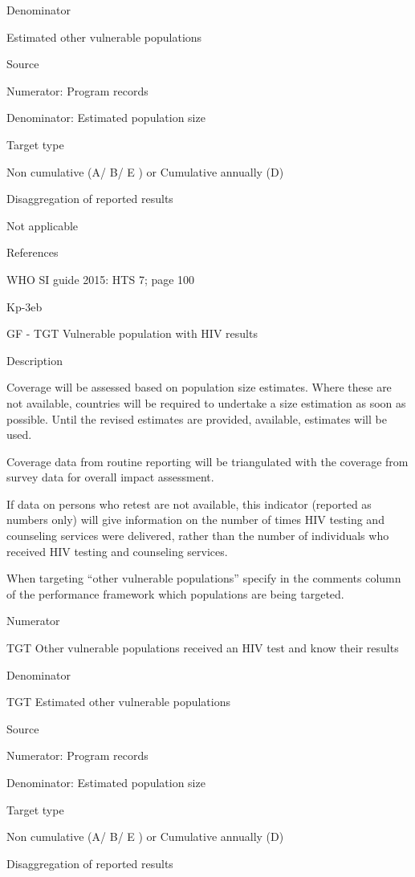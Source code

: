 \documentclass[]{book}
\begin{document}
Denominator

Estimated other vulnerable populations

Source

Numerator: Program records

Denominator: Estimated population size

Target type

Non cumulative (A/ B/ E ) or Cumulative annually (D)

Disaggregation of reported results

Not applicable

References

WHO SI guide 2015: HTS 7; page 100

Kp-3eb

GF - TGT Vulnerable population with HIV results

Description

Coverage will be assessed based on population size estimates. Where these are not available, countries will be required to undertake a size estimation as soon as possible. Until the revised estimates are provided, available, estimates will be used.

Coverage data from routine reporting will be triangulated with the coverage from survey data for overall impact assessment.

If data on persons who retest are not available, this indicator (reported as numbers only) will give information on the number of times HIV testing and counseling services were delivered, rather than the number of individuals who received HIV testing and counseling services.

When targeting ``other vulnerable populations'' specify in the comments column of the performance framework which populations are being targeted.

Numerator

TGT Other vulnerable populations received an HIV test and know their results

Denominator

TGT Estimated other vulnerable populations

Source

Numerator: Program records

Denominator: Estimated population size

Target type

Non cumulative (A/ B/ E ) or Cumulative annually (D)

Disaggregation of reported results
\end{document}
